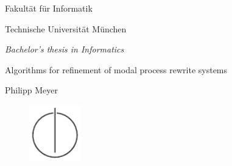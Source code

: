 \thispagestyle{empty}
\begin{titlepage}
  \begin{center}
    \begin{figure}[htp]
      \centering
      \oTUM{6cm}
    \end{figure}

    \vspace*{2\baselineskip}
    
    {\large{\scfont Fakultät für Informatik}}
    
    {\large {\scfont Technische Universität München}}
    
    \vspace{1.5cm}
    
    {\large \em Bachelor's thesis in Informatics}

    {\huge Algorithms for refinement of modal process rewrite systems}

    \vspace{2.5cm}
    
    \large{Philipp Meyer}
    
    \vspace{3.0cm}
    
    \begin{figure}[htp]
      \centering
      \includegraphics[width=0.20\textwidth]{IN_schwarz_CMYK.pdf}
    \end{figure}
  
  \end{center}
\end{titlepage}

